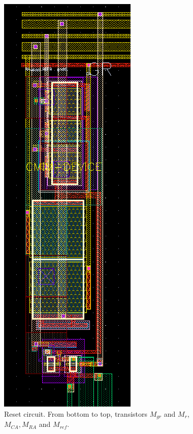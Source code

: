 \begin{figure}
    \center
    \includegraphics{pixel4.png}
    \caption{Reset circuit. From bottom to top, transistors $M_{gr}$ and $M_{r}$, $M_{CA}, M_{RA}$ and $M_{ref}$.}
    \label{fig:layout-4}
\end{figure}
